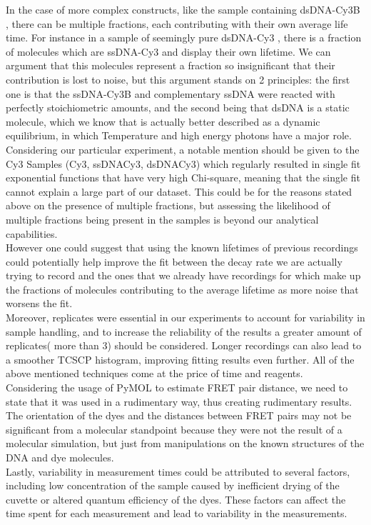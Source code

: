 \documentclass[a4paper,english,12pt,bibliography=totoc]{scrreprt}
\begin{document}
In the case of more complex constructs, like the sample containing dsDNA-Cy3B , there can be multiple fractions, each contributing with their own average life time. For instance in a sample of seemingly pure dsDNA-Cy3 , there is a fraction of molecules which are ssDNA-Cy3 and display their own lifetime. We can argument that this molecules represent a fraction so insignificant that their contribution is lost to noise, but this argument stands on 2 principles: the first one is that the ssDNA-Cy3B and complementary ssDNA were reacted with perfectly stoichiometric amounts, and the second being that dsDNA is a static molecule, which we know that is actually better described as a dynamic equilibrium, in which Temperature and high energy photons have a major role.
\\
Considering our particular experiment, a notable mention should be given to the Cy3 Samples (Cy3, ssDNACy3, dsDNACy3) which regularly resulted in single fit exponential functions that have very high Chi-square, meaning that the single fit cannot explain a large part of our dataset.
This could be for the reasons stated above on the presence of multiple fractions, but assessing the likelihood of multiple fractions being present in the samples is beyond our analytical capabilities.
\\
However one could suggest that using the known lifetimes of previous recordings could potentially help improve the fit between the decay rate we are actually trying to record and the ones that we already have recordings for which make up the fractions of molecules contributing to the average lifetime as more noise that worsens the fit.\\

Moreover, replicates were essential in our experiments to account for variability in sample handling, and to increase the reliability of the results a greater amount of replicates( more than 3) should be considered. Longer recordings can also lead to  a smoother TCSCP histogram, improving fitting results even further. All of the above mentioned techniques come at the price of time and reagents.\\

Considering the usage of PyMOL to estimate FRET pair distance, we need to state that it was used in a rudimentary way, thus creating rudimentary results. The orientation of the dyes and the distances between FRET pairs may not be significant from a molecular standpoint  because they were not the result of a molecular simulation, but just from manipulations on the known structures of the DNA and dye molecules.\\
Lastly, variability in measurement times could be attributed to several factors, including low concentration of the sample caused by inefficient drying of the cuvette or altered quantum efficiency of the dyes. These factors can affect the time spent for each measurement and lead to variability in the measurements.\\
\end{document}
